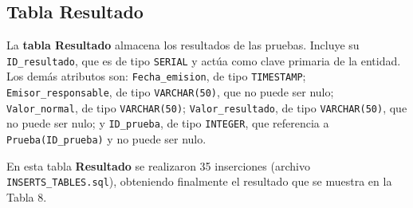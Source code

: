 \documentclass[spanish]{article}
\begin{document}
\subsection{Tabla Resultado}

La \textbf{tabla Resultado} almacena los resultados de las pruebas. Incluye su \texttt{ID\_resultado}, que es de tipo \texttt{SERIAL} y actúa como clave primaria de la entidad. Los demás atributos son: \texttt{Fecha\_emision}, de tipo \texttt{TIMESTAMP}; \texttt{Emisor\_responsable}, de tipo \texttt{VARCHAR(50)}, que no puede ser nulo; \texttt{Valor\_normal}, de tipo \texttt{VARCHAR(50)}; \texttt{Valor\_resultado}, de tipo \texttt{VARCHAR(50)}, que no puede ser nulo; y \texttt{ID\_prueba}, de tipo \texttt{INTEGER}, que referencia a \texttt{Prueba(ID\_prueba)} y no puede ser nulo.

En esta tabla \textbf{Resultado} se realizaron 35 inserciones (archivo \texttt{INSERTS\_TABLES.sql}), obteniendo finalmente el resultado que se muestra en la Tabla 8.
\end{document}
